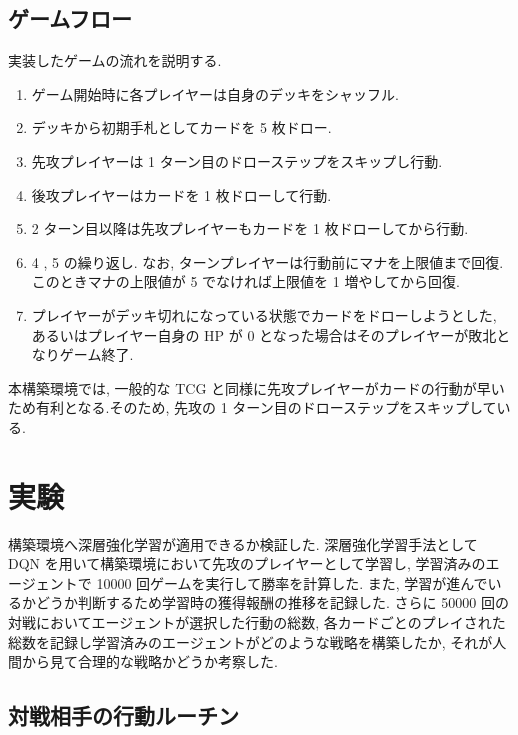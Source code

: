 \documentclass[twocolumn]{jarticle}
\begin{document}
\subsection{ゲームフロー}
実装したゲームの流れを説明する.
\begin{enumerate}
  \small
  \setlength{\itemsep}{0cm} %
  \item ゲーム開始時に各プレイヤーは自身のデッキをシャッフル.
  \item デッキから初期手札としてカードを 5 枚ドロー. 
  \item 先攻プレイヤーは 1 ターン目のドローステップをスキップし行動.
  \item 後攻プレイヤーはカードを 1 枚ドローして行動.
  \item 2 ターン目以降は先攻プレイヤーもカードを 1 枚ドローしてから行動. 
  \item 4 , 5 の繰り返し. なお, ターンプレイヤーは行動前にマナを上限値まで回復. このときマナの上限値が 5 でなければ上限値を 1 増やしてから回復.
  \item プレイヤーがデッキ切れになっている状態でカードをドローしようとした, あるいはプレイヤー自身の HP が 0 となった場合はそのプレイヤーが敗北となりゲーム終了.
\end{enumerate}
\par
本構築環境では, 一般的な TCG と同様に先攻プレイヤーがカードの行動が早いため有利となる.そのため, 先攻の 1 ターン目のドローステップをスキップしている. 

\section{実験}
構築環境へ深層強化学習が適用できるか検証した.
深層強化学習手法として DQN を用いて構築環境において先攻のプレイヤーとして学習し, 学習済みのエージェントで 10000 回ゲームを実行して勝率を計算した. 
また, 学習が進んでいるかどうか判断するため学習時の獲得報酬の推移を記録した.
さらに 50000 回の対戦においてエージェントが選択した行動の総数, 各カードごとのプレイされた総数を記録し学習済みのエージェントがどのような戦略を構築したか, それが人間から見て合理的な戦略かどうか考察した.

\subsection{対戦相手の行動ルーチン}
\end{document}
